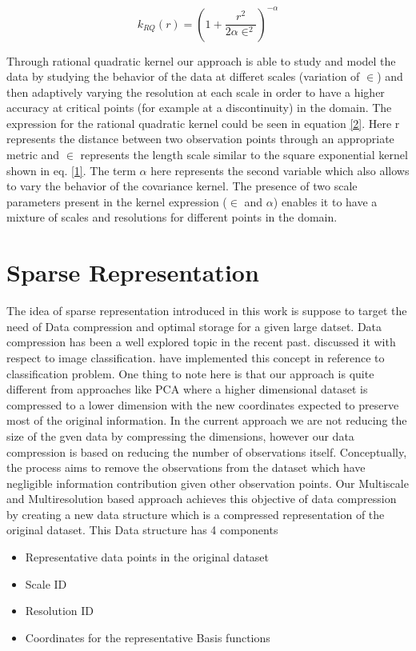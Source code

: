 \documentclass[procedia]{easychair}
\begin{document}
\begin{equation}
k_{RQ}(r) = \left({1 + \frac{r^2}{2 \alpha \in^2}}\right)^{-\alpha}
\label{2}
\end{equation}

Through rational quadratic kernel our approach is able to study and model the data by studying the behavior of the data at differet scales (variation of $\in$) and then adaptively varying the resolution at each scale in order to have a higher accuracy at critical points (for example at a discontinuity) in the domain. The expression for the rational quadratic kernel could be seen in equation \ref{2}. Here r represents the distance between two observation points through an appropriate metric and $\in$ represents the length scale similar to the square exponential kernel shown in eq. \ref{1}. The term $\alpha$ here represents the second variable which also allows to vary the behavior of the covariance kernel. The presence of two scale parameters present in the kernel expression ($\in$ and $\alpha$) enables it to have a mixture of scales and resolutions for different points in the domain.


\section{Sparse Representation}
\label{sect:sparse}

The idea of sparse representation introduced in this work is suppose to target the need of Data compression and optimal storage for a given large datset. Data compression has been a well explored topic in the recent past. \cite{liu2014self} discussed it with respect to image classification. \cite{yang2011learning} have implemented this concept in reference to classification problem. One thing to note here is that our approach is quite different from approaches like PCA where a higher dimensional dataset is compressed to a lower dimension with the new coordinates expected to preserve most of the original information. In the current approach we are not reducing the size of the gven data by compressing the dimensions, however our data compression is based on reducing the number of observations itself. Conceptually, the process aims to remove the observations from the dataset which have negligible information contribution given other observation points.  Our Multiscale and Multiresolution based approach achieves this objective of data compression by creating a new data structure which is a compressed representation of the original dataset. This Data structure has 4 components
 \begin{itemize}
 \item Representative data points in the original dataset
 \item Scale ID
 \item Resolution ID
 \item Coordinates for the representative Basis functions
 \end{itemize}
 
\end{document}
